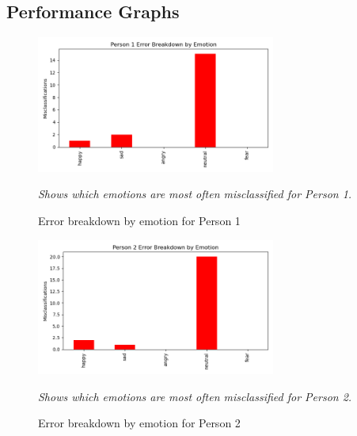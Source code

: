 \documentclass[12pt]{article}
\begin{document}
\subsection{Performance Graphs}
\begin{figure}[h!]
    \centering
    \includegraphics[width=0.7\textwidth]{model_analysis/Person 1_error_breakdown.png}
    \caption{Error breakdown by emotion for Person 1}
    \textit{Shows which emotions are most often misclassified for Person 1.}
\end{figure}
\begin{figure}[h!]
    \centering
    \includegraphics[width=0.7\textwidth]{model_analysis/Person 2_error_breakdown.png}
    \caption{Error breakdown by emotion for Person 2}
    \textit{Shows which emotions are most often misclassified for Person 2.}
\end{figure}
\end{document}
